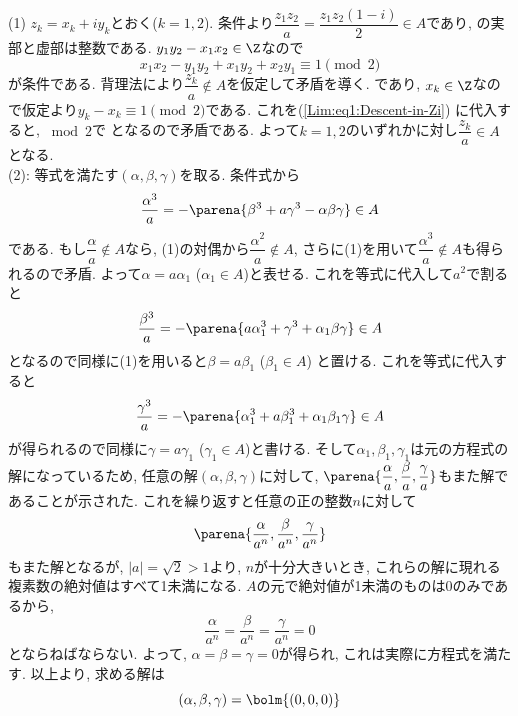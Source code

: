 (1) $z_k = x_k + iy_k$とおく($k=1,2$). 条件より$\dfrac{z_1z_2}{a} = \dfrac{z_1z_2(1-i)}{2} \in A$であり,
の実部と虚部は整数である. $y_1y_2-x_1x_2\in \Z$なので
\begin{equation} \label{Lim:eq1:Descent-in-Zi}
x_1x_2 - y_1y_2 + x_1y_2 + x_2y_1 \equiv 1\pmod{2}
\end{equation}
が条件である.
背理法により$\dfrac{z_k}{a} \notin A$を仮定して矛盾を導く.
であり, $x_k\in \Z$なので仮定より$y_k - x_k \equiv 1\pmod{2}$である. これを(\ref{Lim:eq1:Descent-in-Zi}) に代入すると, $\bmod{2}$で
となるので矛盾である. よって$k=1,2$のいずれかに対し$\dfrac{z_k}{a} \in A$となる. \\
(2): 等式を満たす$(\alpha,\beta,\gamma)$を取る. 条件式から
\[
\dfrac{\alpha^3}{a} = -\parena{\beta^3 + a\gamma^3 - \alpha\beta\gamma} \in A
\]
である. もし$\dfrac{\alpha}{a}\notin A$なら, (1)の対偶から$\dfrac{\alpha^2}{a}\notin A$, さらに(1)を用いて$\dfrac{\alpha^3}{a}\notin A$も得られるので矛盾. よって$\alpha = a\alpha_1$ ($\alpha_1\in A$)と表せる. これを等式に代入して$a^2$で割ると
\[
\dfrac{\beta^3}{a} = -\parena{a\alpha_1^3 + \gamma^3 + \alpha_1\beta\gamma} \in A
\]
となるので同様に(1)を用いると$\beta = a\beta_1$ ($\beta_1\in A$) と置ける. これを等式に代入すると
\[
\dfrac{\gamma^3}{a} = -\parena{\alpha_1^3 + a\beta_1^3 + \alpha_1\beta_1\gamma} \in A
\]
が得られるので同様に$\gamma = a\gamma_1$ ($\gamma_1\in A$)と書ける. そして$\alpha_1,\beta_1,\gamma_1$は元の方程式の解になっているため, 任意の解$(\alpha,\beta,\gamma)$に対して, $\parena{\dfrac{\alpha}{a}, \dfrac{\beta}{a}, \dfrac{\gamma}{a}}$もまた解であることが示された. これを繰り返すと任意の正の整数$n$に対して
\[
\parena{\dfrac{\alpha}{a^n}, \dfrac{\beta}{a^n}, \dfrac{\gamma}{a^n}}
\]
もまた解となるが, $|a| = \sqrt{2} > 1$より, $n$が十分大きいとき, これらの解に現れる複素数の絶対値はすべて1未満になる. $A$の元で絶対値が1未満のものは0のみであるから,
\[
\dfrac{\alpha}{a^n} = \dfrac{\beta}{a^n} = \dfrac{\gamma}{a^n} = 0
\]
とならねばならない. よって, $\alpha = \beta = \gamma = 0$が得られ, これは実際に方程式を満たす. 以上より, 求める解は
\[
(\alpha,\beta,\gamma) = \bolm{(0,0,0)}
\]
